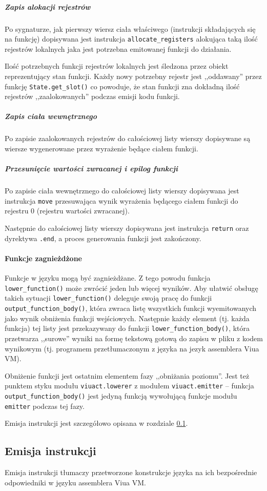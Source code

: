 \subparagraph{Zapis alokacji rejestrów}

Po sygnaturze, jak pierwszy wiersz ciała właściwego (instrukcji składających się
na funkcję) dopisywana jest instrukcja \texttt{allocate\_registers} alokująca
taką ilość rejestrów lokalnych jaka jest potrzebna emitowanej funkcji do
działania.

Ilość potrzebnych funkcji rejestrów lokalnych jest śledzona przez obiekt
reprezentujący stan funkcji. Każdy nowy potrzebny rejestr jest ,,oddawany''
przez funkcję \texttt{State.get\_slot()} co powoduje, że stan funkcji zna
dokładną ilość rejestrów ,,zaalokowanych'' podczas emisji kodu funkcji.

\subparagraph{Zapis ciała wewnętrznego}

Po zapisie zaalokowanych rejestrów do całościowej listy wierszy dopisywane są
wiersze wygenerowane przez wyrażenie będące ciałem funkcji.

\subparagraph{Przesunięcie wartości zwracanej i epilog funkcji}

Po zapisie ciała wewnętrznego do całościowej listy wierszy dopisywana jest
instrukcja \texttt{move} przesuwająca wynik wyrażenia będącego ciałem funkcji do
rejestru 0 (rejestru wartości zwracanej).

Następnie do całościowej listy wierszy dopisywana jest instrukcja \texttt{return}
oraz dyrektywa \texttt{.end}, a proces generowania funkcji jest zakończony.

\paragraph{Funkcje zagnieżdżone}

Funkcje w języku \ViuAct\phantom{} mogą być zagnieżdżane. Z tego powodu funkcja
\texttt{lower\_function()} może zwrócić jeden lub więcej wyników. Aby ułatwić
obsługę takich sytuacji \texttt{lower\_function()} deleguje swoją pracę do
funkcji \texttt{output\_function\_body()}, która zwraca listę wszystkich funkcji
wyemitowanych jako wynik obniżenia funkcji wejściowych. Następnie każdy element
(tj. każda funkcja) tej listy jest przekazywany do funkcji \texttt{lower\_function\_body()},
która przetwarza ,,surowe'' wyniki na formę tekstową gotową do zapisu w pliku z
kodem wynikowym (tj. programem przetłumaczonym z języka \ViuAct\phantom{} na
jezyk assemblera Viua VM).

\vspace{1em}

Obniżenie funkcji jest ostatnim elementem fazy ,,obniżania poziomu''. Jest też
punktem styku modułu \texttt{viuact.lowerer} z modułem \texttt{viuact.emitter}
-- funkcja \texttt{output\_function\_body()} jest jedyną funkcją wywołującą
funkcje modułu \texttt{emitter} podczas tej fazy.

Emisja instrukcji jest szczegółowo opisana w rozdziale \ref{viuact_cc_impl_desc_emit}.

\subsection{Emisja instrukcji}
\label{viuact_cc_impl_desc_emit}

Emisja instrukcji tłumaczy przetworzone konstrukcje języka \ViuAct\phantom{} na
ich bezpośrednie odpowiedniki w języku assemblera Viua VM.
